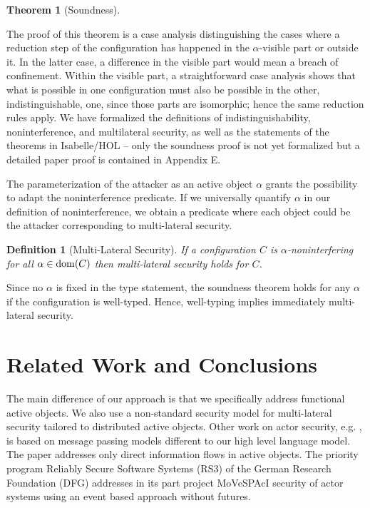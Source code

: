 \documentclass[10pt, conference, compsocconf]{IEEEtran}
\newcommand\dom{{\rm dom}}
\newtheorem{theorem}{Theorem}
\newtheorem{definition}{Definition}[section]
\begin{document}
{\begin{theorem}[Soundness]
\end{theorem}
The proof of this theorem is a case analysis distinguishing the 
cases where a reduction step of the configuration has happened 
in the $\alpha$-visible part or outside it. 
In the latter case, a difference in the visible part would mean a breach of confinement.
Within the visible part, a straightforward case analysis shows that what is possible
in one configuration must also be possible in the other, indistinguishable, one, since 
those parts are isomorphic; hence the same reduction rules apply.
We have formalized the definitions of indistinguishability, noninterference, and 
multilateral security, as well as the statements of the theorems in Isabelle/HOL
-- only the soundness proof is not yet formalized but a detailed paper proof is
contained in Appendix E.

The parameterization of the attacker as an active object $\alpha$ grants the 
possibility to adapt the noninterference predicate.
If we universally quantify $\alpha$ in our definition of noninterference, we 
obtain a predicate where each object could be the attacker corresponding to multi-lateral security.
\begin{definition}[Multi-Lateral Security]
If a configuration $C$ is $\alpha$-noninterfering for all
$\alpha \in \dom(C)$ then multi-lateral security holds for $C$.
\end{definition}
Since no $\alpha$ is fixed in the type statement, the soundness theorem holds
for any $\alpha$ if the configuration is well-typed. Hence, well-typing implies
immediately multi-lateral security.




\section{Related Work and Conclusions}
\label{sec:concl}
The main difference of our approach is that we specifically address functional active 
objects. We also use a non-standard security model \cite{kam:12} for 
multi-lateral security tailored to distributed active objects.
Other work on actor security, e.g. \cite{hmss:07}, is based on message passing
models different to our high level language model. The paper \cite{achl:07}
addresses only direct information flows in active objects.
The priority program Reliably Secure Software Systems (RS3) of the 
German Research Foundation (DFG) \cite{rs3:10} addresses in its part project MoVeSPAcI 
\cite{pf:11} security of actor systems using an event based approach without futures.

}
\end{document}
